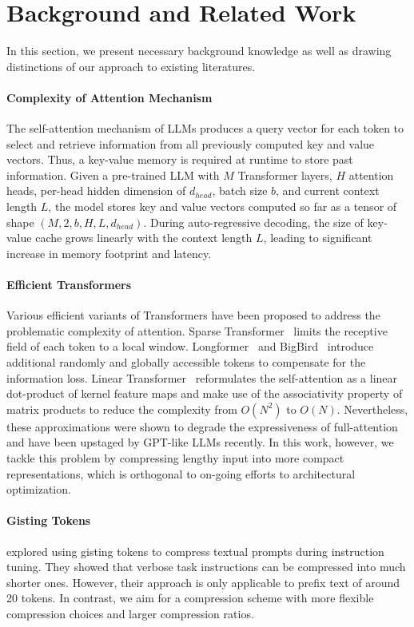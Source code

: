 \section{Background and Related Work}
In this section, we present necessary background knowledge as well as drawing distinctions of our approach to existing literatures.
\paragraph{Complexity of Attention Mechanism}
The self-attention mechanism of LLMs produces a query vector for each token to select and retrieve information from all previously computed key and value vectors. Thus, a key-value memory is required at runtime to store past information. Given a pre-trained LLM with $M$ Transformer layers, $H$ attention heads, per-head hidden dimension of $d_{head}$, batch size $b$, and current context length $L$, the model stores key and value vectors computed so far as a tensor of shape $(M,2,b,H,L,d_{head})$. During auto-regressive decoding, the size of key-value cache grows linearly with the context length $L$, leading to significant increase in memory footprint and latency.

\paragraph{Efficient Transformers}
Various efficient variants of Transformers have been proposed to address the problematic complexity of attention. Sparse Transformer~\cite{local} limits the receptive field of each token to a local window. Longformer~\cite{longformer} and BigBird~\cite{bigbird} introduce additional randomly and globally accessible tokens to compensate for the information loss. Linear Transformer~\cite{lineartransformer} reformulates the self-attention as a linear dot-product of kernel feature maps and make use of the associativity property of matrix products to reduce the complexity from $O(N^2)$ to $O(N)$. Nevertheless, these approximations were shown to degrade the expressiveness of full-attention and have been upstaged by GPT-like LLMs recently. In this work, however, we tackle this problem by compressing lengthy input into more compact representations, which is orthogonal to on-going efforts to architectural optimization.

\paragraph{Gisting Tokens}
\citet{gist} explored using gisting tokens to compress textual prompts during instruction tuning. They showed that verbose task instructions can be compressed into much shorter ones. However, their approach is only applicable to prefix text of around 20 tokens. In contrast, we aim for a compression scheme with more flexible compression choices and larger compression ratios.

